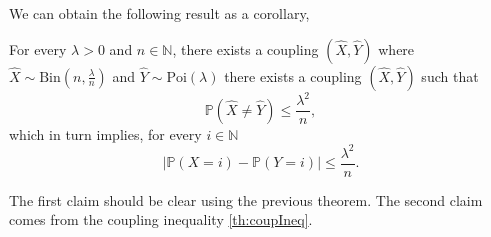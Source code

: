 We can obtain the following result as a corollary,
\begin{corollary}\label{th:poiIneqCoup}
	For every $\lambda > 0$ and $n\in \mathbb{N}$, there exists a coupling $(\hat{X}, \hat{Y})$ where $\hat{X} \sim \text{Bin}(n, \frac{\lambda}{n})$ and 
	$\hat{Y} \sim \text{Poi}(\lambda)$ there exists a coupling $(\hat{X}, \hat{Y})$ such that 
	\begin{equation}
		\mathbb{P}(\hat{X} \neq \hat{Y}) \leq \frac{\lambda^2}{n},
	\end{equation}
which in turn implies, for every $i\in \mathbb{N}$
	\begin{equation}
		|\mathbb{P}(X = i) - \mathbb{P}(Y=i)| \leq \frac{\lambda^2}{n}.
	\end{equation}
\end{corollary}
The first claim should be clear using the previous theorem. The second claim comes from the coupling inequality \ref{th:coupIneq}.
